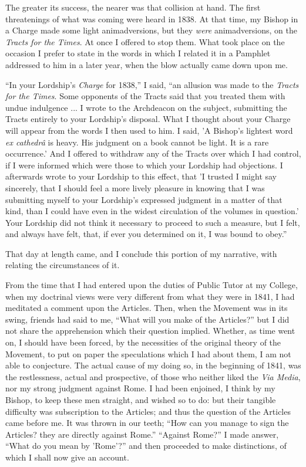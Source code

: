 The greater its success, the nearer was that collision at hand. The
first threatenings of what was coming were heard in 1838. At that
time, my Bishop in a Charge made some light animadversions, but they \emph{were}
animadversions, on the \emph{Tracts for the Times}. At once I offered to stop
them. What took place on the occasion I prefer to state in the
words in
which I related it in a Pamphlet addressed to him in a later year, when
the blow actually came down upon me.

``In your Lordship's \emph{Charge} for 1838,'' I said, ``an
allusion was made to the \emph{Tracts for the Times}. Some opponents of the
Tracts said that you treated them with undue indulgence ... I wrote to
the Archdeacon on the subject, submitting the Tracts entirely to your
Lordship's disposal. What I thought about your Charge will appear from
the words I then used to him. I said, 'A Bishop's lightest word \emph{ex
cathedrâ} is heavy. His judgment on a book cannot be light. It
is a rare occurrence.' And I offered to withdraw any of the Tracts over
which I had control, if I were informed which were those to which your
Lordship had objections. I afterwards wrote to your Lordship to this
effect, that 'I trusted I might say sincerely, that I should feel a more
lively pleasure in knowing that I was submitting myself to your
Lordship's expressed judgment in a matter of that kind, than I could
have even in the widest circulation of the volumes in question.' Your
Lordship did not think it necessary to proceed to such a measure, but I
felt, and always have felt, that, if ever you determined on it, I was
bound to obey.''

That day at length came, and I conclude this portion of my narrative,
with relating the circumstances of it.

From the time that I had entered upon the duties of Public Tutor at
my College, when my doctrinal views were very different from what they
were in 1841, I had meditated a comment upon the Articles. Then, when
the Movement was in its swing, friends had said to me, ``What will
you make of the Articles?'' but I did not share the apprehension
which their question implied. Whether, as time went on, I should have
been forced, by the necessities of the original theory of the Movement,
to put on paper the speculations which I had about them, I am not able
to conjecture. The actual cause of my doing so, in the beginning of
1841, was the restlessness, actual and prospective, of those who neither
liked the \emph{Via Media}, nor my strong judgment against Rome. I had
been enjoined, I think by my Bishop, to keep these men straight, and
wished so to do: but their tangible difficulty was subscription to the
Articles; and thus the question of the Articles came before me. It was
thrown in our teeth; ``How can you manage to sign the Articles? they are
directly against Rome.'' ``Against Rome?'' I made answer,
``What do you mean by 'Rome'?'' and then proceeded to make
distinctions, of which I shall now give an account.

